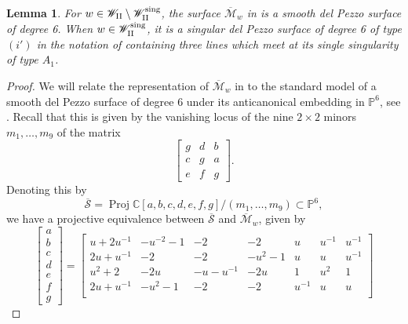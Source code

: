 \documentclass[a4paper,reqno]{amsart}
\numberwithin{equation}{section}
\newcommand{\C}{\mathbb{C}}
\newcommand{\p}{\mathbb{P}}
\DeclareMathOperator{\Proj}{Proj}
\newtheorem{lemma}[theorem]{Lemma}
\numberwithin{equation}{section}
\begin{document}
\begin{lemma}\label{lem:delpezzodeg6PII}
    For $w \in \mathscr{W}_{\rm{II}}\setminus \mathscr{W}_{\rm{II}}^{\operatorname{sing}}$, the surface $\overline{\mathcal{M}}_w$ in  is a smooth del Pezzo surface of degree 6. When $w \in  \mathscr{W}_{\rm{II}}^{\operatorname{sing}}$, it is a singular del Pezzo surface of degree 6 of type $(i')$ in the notation of \cite{dolgachevclassicalAG} containing three lines which meet at its single singularity of type $A_1$.
    
\end{lemma}
\begin{proof}
    We will relate the representation of $\overline{\mathcal{M}}_w$ in  to the standard model of a smooth del Pezzo surface of degree 6 under its anticanonical embedding in $\p^6$, see \cite[Th. 8.4.9]{dolgachevclassicalAG}.
    Recall that this is given by the vanishing locus of the nine $2\times2$ minors $m_1,\dots,m_9$ of the matrix
    $$     \begin{bmatrix}
        g & d & b\\
        c & g & a\\
        e & f & g
    \end{bmatrix}.$$ 
    Denoting this by 
    \begin{equation} \label{eq:standardmodeldepPezzoPII}
        \overline{\mathcal{S}}=\Proj \C[a,b,c,d,e,f,g] / (m_1,\dots,m_9)\subset \p^6,
    \end{equation}
    we have a projective equivalence between $\overline{\mathcal{S}}$ and $\overline{\mathcal{M}}_w$, given by
    \begin{equation}\label{eq:projectivityStoMPII}
    \begin{bmatrix}
    a\\
    b\\
    c\\
    d\\
    e\\
    f\\
    g
    \end{bmatrix}
    = \begin{bmatrix}
 u+2u^{-1} & -u^{-2}-1 & -2 & -2 & u & u^{-1} & u^{-1} \\
 2 u+u^{-1} & -2 & -2 & -u^2-1 & u & u & u^{-1} \\
 u^2+2 & -2 u & -u-u^{-1} & -2 u & 1 & u^2 & 1 \\
 2 u+u^{-1} & -u^2-1 & -2 & -2 & u^{-1} & u & u \\

\end{bmatrix}
\end{equation}
\end{proof}
\end{document}
